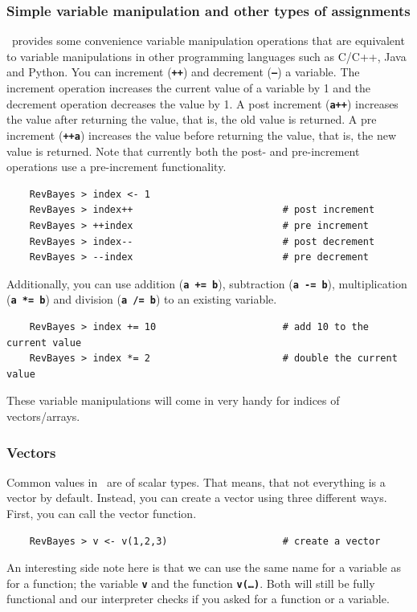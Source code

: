 \documentclass[11pt]{article}
\newcommand{\cl}[1]{{\texttt{\textbf{#1}}}}
\begin{document}
\subsubsection*{Simple variable manipulation and other types of assignments}
\Rev~provides some convenience variable manipulation operations that are equivalent to variable manipulations in other programming languages such as C/C++, Java and Python.
You can increment (\cl{++}) and decrement (\cl{--}) a variable.
The increment operation increases the current value of a variable by 1 and the decrement operation decreases the value by 1.
A post increment (\cl{a++}) increases the value after returning the value, that is, the old value is returned.
A pre increment (\cl{++a}) increases the value before returning the value, that is, the new value is returned.
Note that currently both the post- and pre-increment operations use a pre-increment functionality.
{\tt \begin{snugshade*}
\begin{lstlisting}    
    RevBayes > index <- 1
    RevBayes > index++                          # post increment
    RevBayes > ++index                          # pre increment
    RevBayes > index--                          # post decrement
    RevBayes > --index                          # pre decrement
\end{lstlisting}
\end{snugshade*}}
Additionally, you can use addition (\cl{a += b}), subtraction (\cl{a -= b}), multiplication (\cl{a *= b}) and division (\cl{a /= b}) to an existing variable.
{\tt \begin{snugshade*}
\begin{lstlisting}    
    RevBayes > index += 10                      # add 10 to the current value
    RevBayes > index *= 2                       # double the current value
\end{lstlisting}
\end{snugshade*}}
These variable manipulations will come in very handy for indices of vectors/arrays.

\subsubsection*{Vectors}
Common values in \RevBayes~are of scalar types.
That means, that not everything is a vector by default.
Instead, you can create a vector using three different ways.
First, you can call the vector function.
{\tt \begin{snugshade*}
\begin{lstlisting}    
    RevBayes > v <- v(1,2,3)                    # create a vector
\end{lstlisting}
\end{snugshade*}}
An interesting side note here is that we can use the same name for a variable as for a function; the variable \cl{v} and the function \cl{v(\ldots)}.
Both will still be fully functional and our interpreter checks if you asked for a function or a variable.
\end{document}
